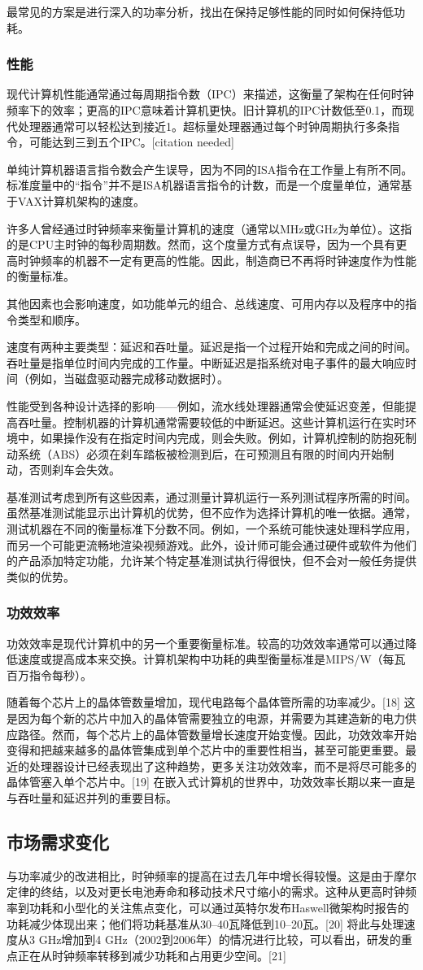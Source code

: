 最常见的方案是进行深入的功率分析，找出在保持足够性能的同时如何保持低功耗。
\subsubsection{性能}  
现代计算机性能通常通过每周期指令数（IPC）来描述，这衡量了架构在任何时钟频率下的效率；更高的IPC意味着计算机更快。旧计算机的IPC计数低至0.1，而现代处理器通常可以轻松达到接近1。超标量处理器通过每个时钟周期执行多条指令，可能达到三到五个IPC。[citation needed]

单纯计算机器语言指令数会产生误导，因为不同的ISA指令在工作量上有所不同。标准度量中的“指令”并不是ISA机器语言指令的计数，而是一个度量单位，通常基于VAX计算机架构的速度。

许多人曾经通过时钟频率来衡量计算机的速度（通常以MHz或GHz为单位）。这指的是CPU主时钟的每秒周期数。然而，这个度量方式有点误导，因为一个具有更高时钟频率的机器不一定有更高的性能。因此，制造商已不再将时钟速度作为性能的衡量标准。

其他因素也会影响速度，如功能单元的组合、总线速度、可用内存以及程序中的指令类型和顺序。

速度有两种主要类型：延迟和吞吐量。延迟是指一个过程开始和完成之间的时间。吞吐量是指单位时间内完成的工作量。中断延迟是指系统对电子事件的最大响应时间（例如，当磁盘驱动器完成移动数据时）。

性能受到各种设计选择的影响——例如，流水线处理器通常会使延迟变差，但能提高吞吐量。控制机器的计算机通常需要较低的中断延迟。这些计算机运行在实时环境中，如果操作没有在指定时间内完成，则会失败。例如，计算机控制的防抱死制动系统（ABS）必须在刹车踏板被检测到后，在可预测且有限的时间内开始制动，否则刹车会失效。

基准测试考虑到所有这些因素，通过测量计算机运行一系列测试程序所需的时间。虽然基准测试能显示出计算机的优势，但不应作为选择计算机的唯一依据。通常，测试机器在不同的衡量标准下分数不同。例如，一个系统可能快速处理科学应用，而另一个可能更流畅地渲染视频游戏。此外，设计师可能会通过硬件或软件为他们的产品添加特定功能，允许某个特定基准测试执行得很快，但不会对一般任务提供类似的优势。
\subsubsection{功效效率}  
功效效率是现代计算机中的另一个重要衡量标准。较高的功效效率通常可以通过降低速度或提高成本来交换。计算机架构中功耗的典型衡量标准是MIPS/W（每瓦百万指令每秒）。

随着每个芯片上的晶体管数量增加，现代电路每个晶体管所需的功率减少。[18] 这是因为每个新的芯片中加入的晶体管需要独立的电源，并需要为其建造新的电力供应路径。然而，每个芯片上的晶体管数量增长速度开始变慢。因此，功效效率开始变得和把越来越多的晶体管集成到单个芯片中的重要性相当，甚至可能更重要。最近的处理器设计已经表现出了这种趋势，更多关注功效效率，而不是将尽可能多的晶体管塞入单个芯片中。[19] 在嵌入式计算机的世界中，功效效率长期以来一直是与吞吐量和延迟并列的重要目标。
\subsection{市场需求变化}  
与功率减少的改进相比，时钟频率的提高在过去几年中增长得较慢。这是由于摩尔定律的终结，以及对更长电池寿命和移动技术尺寸缩小的需求。这种从更高时钟频率到功耗和小型化的关注焦点变化，可以通过英特尔发布Haswell微架构时报告的功耗减少体现出来；他们将功耗基准从30–40瓦降低到10–20瓦。[20] 将此与处理速度从3 GHz增加到4 GHz（2002到2006年）的情况进行比较，可以看出，研发的重点正在从时钟频率转移到减少功耗和占用更少空间。[21]